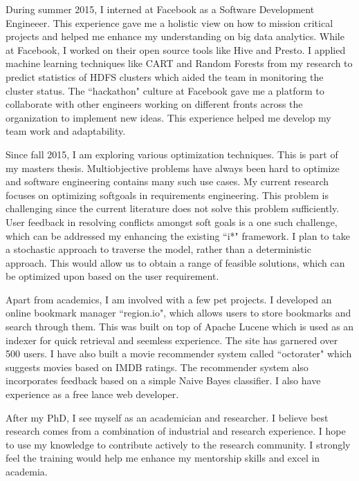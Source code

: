 \documentclass{article}
\begin{document}
\bigskip
During summer 2015, I interned at Facebook as a Software Development Engineeer. This experience gave me a holistic view on how to mission critical projects and helped me enhance my understanding on big data analytics. While at Facebook, I worked on their open source tools like Hive and Presto. I applied machine learning techniques like CART and Random Forests from my research to predict statistics of HDFS clusters which aided the team in monitoring the cluster status. The ``hackathon" culture at Facebook gave me a platform to collaborate with other engineers working on different fronts across the organization to implement new ideas. This experience helped me develop my team work and adaptability. 

\bigskip
Since fall 2015, I am exploring various optimization techniques. This is part of my masters thesis. Multiobjective problems have always been hard to optimize and software engineering contains many such use cases. My current research focuses on optimizing softgoals in requirements engineering. This problem is challenging since the current literature does not solve this problem sufficiently. User feedback in resolving conflicts amongst soft goals is a one such challenge, which can be addressed my enhancing the existing ``i*" framework. I plan to take a stochastic approach to traverse the model, rather than a deterministic approach. This would allow us to obtain a range of feasible solutions, which can be optimized upon based on the user requirement.

\bigskip
Apart from academics, I am involved with a few pet projects. I developed an online bookmark manager ``region.io", which allows users to store bookmarks and search through them. This was built on top of Apache Lucene which is used as an indexer for quick retrieval and seemless experience. The site has garnered over 500 users. I have also built a movie recommender system called ``octorater" which suggests movies based on IMDB ratings. The recommender system also incorporates feedback based on a simple Naive Bayes classifier. I also have experience as a free lance web developer.

\bigskip
After my PhD, I see myself as an academician and researcher. I believe best research comes from a combination of industrial and research experience. I hope to use my knowledge to contribute actively to the research community. I strongly feel the training would help me enhance my mentorship skills and excel in academia.
\end{document}
